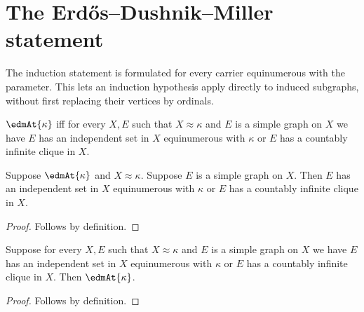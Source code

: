 \section{The Erdős--Dushnik--Miller statement}





The induction statement is formulated for every carrier equinumerous with the
parameter.  This lets an induction hypothesis apply directly to induced
subgraphs, without first replacing their vertices by ordinals.

\begin{definition}\label{edm_at}
    $\edmAt{\kappa}$ iff for every $X,E$ such that
        $X\approx\kappa$ and $E$ is a simple graph on $X$ we have
        $E$ has an independent set in $X$ equinumerous with $\kappa$ or
        $E$ has a countably infinite clique in $X$.
\end{definition}

\begin{proposition}\label{edm_at_elim}
    Suppose $\edmAt{\kappa}$ and $X\approx\kappa$.
    Suppose $E$ is a simple graph on $X$.
    Then $E$ has an independent set in $X$ equinumerous with $\kappa$ or
        $E$ has a countably infinite clique in $X$.
\end{proposition}
\begin{proof}
    Follows by definition.
\end{proof}

\begin{proposition}\label{edm_at_intro}
    Suppose for every $X,E$ such that
        $X\approx\kappa$ and $E$ is a simple graph on $X$ we have
        $E$ has an independent set in $X$ equinumerous with $\kappa$ or
        $E$ has a countably infinite clique in $X$.
    Then $\edmAt{\kappa}$.
\end{proposition}
\begin{proof}
    Follows by definition.
\end{proof}
